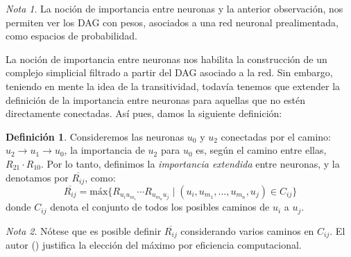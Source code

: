 \documentclass[12pt, a4paper, twoside]{book}
\numberwithin{equation}{section}
\theoremstyle{definition}
\newtheorem{defi}{Definición}[section]
\theoremstyle{remark}
\newtheorem*{remark}{Nota}
\theoremstyle{plain}
\begin{document}
	\begin{remark}
		La noción de importancia entre neuronas y la anterior 
		observación, nos permiten ver los DAG con pesos, asociados a 
		una red neuronal prealimentada, como espacios de probabilidad.
	\end{remark}

	La noción de importancia entre neuronas nos habilita la construcción 
	de un complejo simplicial filtrado a partir del DAG asociado a la red. 
	Sin embargo, teniendo en mente la idea de la transitividad, todavía 
	tenemos que extender la definición de la importancia entre neuronas 
	para aquellas que no estén directamente conectadas. Así pues, damos la 
	siguiente definición: 
	\begin{defi}
	Consideremos las neuronas $u_{0}$ y $u_{2}$ conectadas por el camino: 
	$u_{2} 
	\rightarrow u_{1} \rightarrow u_{0}$, la importancia de $u_{2}$ para 
	$u_{0}$ es, según el camino entre ellas, $R_{21} \cdot R_{10}$.
	Por lo tanto, definimos la \textit{importancia extendida} entre 
	neuronas, y la denotamos por $\overline{R_{ij}}$, como:
	\begin{equation}
		\overline{R_{ij}}=\text{máx}\{R_{u_{i}u_{m_{1}}} \cdots
		R_{u_{m_{n}}u_{j}} \mid (u_{i},u_{m_{1}},...,u_{m_{n}},u_{j}) 
	\in C_{ij} \}
		\label{def:ie}
	\end{equation}	
	donde $C_{ij}$ denota el conjunto de todos los posibles caminos de 
	$u_{i}$ a $u_{j}$. 
	\end{defi}

	\begin{remark}
	Nótese que es posible definir $\overline{R_{ij}}$ considerando varios 
	caminos en $C_{ij}$. El autor (\cite{Articulo-Watanabe}) justifica la 
	elección del máximo por eficiencia computacional.
	\end{remark}
\end{document}
